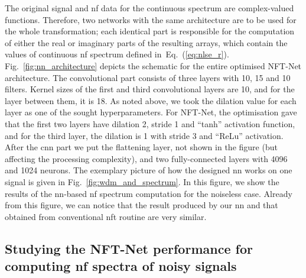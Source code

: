 The original signal and \acrshort{nf} data for the continuous spectrum are complex-valued functions. Therefore, two networks with the same architecture are to be used for the whole transformation; each identical part is responsible for the computation of either the real or imaginary parts of the resulting arrays, which contain the values of continuous \acrshort{nf} spectrum defined in~Eq.~(\ref{eq:nlse_r}).  Fig.~\ref{fig:nn_architecture} depicts the schematic for the entire optimised NFT-Net architecture. The convolutional part consists of three layers with 10, 15 and 10 filters. Kernel sizes of the first and third convolutional layers are 10, and for the layer between them, it is 18. As noted above, we took the dilation value for each layer as one of the sought hyperparameters. For NFT-Net, the optimisation gave that the first two layers have dilation 2, stride 1 and ``tanh'' activation function, and for the third layer, the dilation is 1 with stride 3 and ``ReLu''  activation. After the \acrshort{cnn} part we put the flattening layer, not shown in the figure (but affecting the processing complexity), and two fully-connected layers with 4096 and 1024 neurons. The exemplary picture of how the designed \acrshort{nn} works on one signal is given in Fig.~\ref{fig:wdm_and_spectrum}. In this figure, we show the results of the \acrshort{nn}-based \acrshort{nf} spectrum computation for the noiseless case. Already from this figure, we can notice that the result produced by our \acrshort{nn} and that obtained from conventional \acrshort{nft} routine\cite{FNFT2018} are very similar. 


\subsection{Studying the NFT-Net performance for computing \acrshort{nf} spectra of noisy signals}

